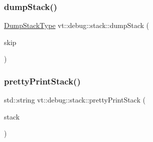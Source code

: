 \subsubsection{\texorpdfstring{dump\+Stack()}{dumpStack()}}
{\footnotesize\ttfamily \hyperlink{namespacevt_1_1debug_1_1stack_a68d963f7e74664a123681e231d7913d9}{Dump\+Stack\+Type} vt\+::debug\+::stack\+::dump\+Stack (\begin{DoxyParamCaption}\item[{int}]{skip }\end{DoxyParamCaption})}

\mbox{\label{namespacevt_1_1debug_1_1stack_a6c32eaeca4f5c8da5af1451d77031b3e}} 
\subsubsection{\texorpdfstring{pretty\+Print\+Stack()}{prettyPrintStack()}}
{\footnotesize\ttfamily std\+::string vt\+::debug\+::stack\+::pretty\+Print\+Stack (\begin{DoxyParamCaption}\item[{\hyperlink{namespacevt_1_1debug_1_1stack_a29a3bbd4c51f20720ef437f124de9b62}{Stack\+Vector\+Type} const \&}]{stack }\end{DoxyParamCaption})\hspace{0.3cm}{\ttfamily [inline]}}


